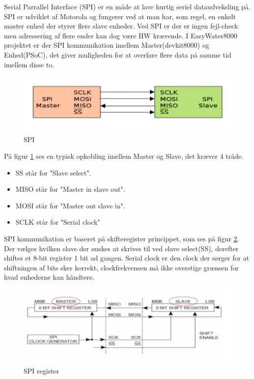Serial Parrallel Interface (SPI) er en måde at lave hurtig seriel dataudveksling på. SPI er udviklet af Motorola og fungerer ved at man
har, som regel, en enkelt master enhed der styrer flere slave enheder. Ved SPI er der er ingen fejl-check men adressering af flere ender kan dog være 
HW krævende. I EasyWater8000 projektet er der SPI kommunikation imellem Master(devkit8000)
og Enhed(PSoC), det giver muligheden for at overføre flere data på samme tid imellem disse to.

\begin{figure}[H] \centering
{\includegraphics[width=\textwidth]{filer/design/Billeder/SPI_MASTER_SLAVE}}
\caption{SPI}
\label{lab:SPI}
\raggedright
\end{figure}

På figur \ref{lab:SPI} ses en typisk opkobling imellem Master og Slave, det kræver 4 tråde.
\begin{itemize}
 	\item SS står for "Slave select".
 	\item MISO står for "Master in slave out".
 	\item MOSI står for "Master out slave in". 
	\item SCLK står for "Serial clock" 
\end{itemize}

SPI kommunikation er baseret på skifteregister princippet, som ses på figur \ref{lab:SPI_REGISTER}. Der vælges hvilken slave der 
ønskes at skrives til ved slave select(SS), derefter shiftes et 8-bit register 1 bit ad gangen. Serial clock er den clock der sørger for at
shiftningen af bits sker korrekt, clockfrekvensen må ikke overstige grænsen for hvad enhederne kan håndtere.

\begin{figure}[H] \centering
{\includegraphics[width=\textwidth]{filer/design/Billeder/SPI_REGISTER}}
\caption{SPI register}
\label{lab:SPI_REGISTER}
\raggedright
\end{figure}  


